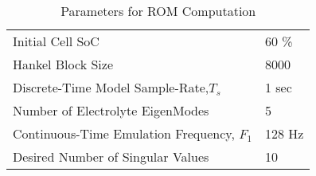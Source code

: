\newpage
\singlespacing
\begin{table}[h]
	\begin{center}
		\caption{Parameters for ROM Computation}
		\label{table:simparams}
		\begin{tabular}{ l l }
			\hline
			Initial Cell SoC & 60 \%  \\
			Hankel Block Size & 8000 \\
			Discrete-Time Model Sample-Rate,$T_s$ & 1 sec  \\
			Number of Electrolyte EigenModes & 5 \\
			Continuous-Time Emulation Frequency, $F_1$ & 128 Hz \\
			Desired Number of Singular Values &	10 \\
			\hline
		\end{tabular}
	\end{center}
\end{table}

\newpage
\singlespacing

